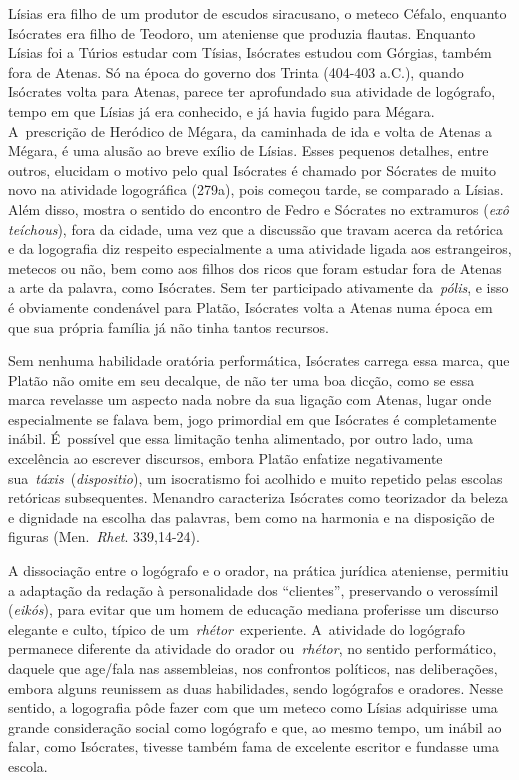 Lísias era filho de um produtor de escudos siracusano, o meteco Céfalo,
enquanto Isócrates era filho de Teodoro, um ateniense que produzia
flautas. Enquanto Lísias foi a Túrios estudar com Tísias, Isócrates
estudou com Górgias, também fora de Atenas. Só na época do governo dos
Trinta (404-403 a.C.), quando Isócrates volta para Atenas, parece ter
aprofundado sua atividade de logógrafo, tempo em que Lísias já era
conhecido, e já havia fugido para Mégara. A~prescrição de Heródico de
Mégara, da caminhada de ida e volta de Atenas a Mégara, é uma alusão ao
breve exílio de Lísias. Esses pequenos detalhes, entre outros, elucidam
o motivo pelo qual Isócrates é chamado por Sócrates de muito novo na atividade
logográfica (279a), pois começou tarde, se comparado a Lísias.
Além disso, mostra o sentido do encontro de Fedro e Sócrates no
extramuros (\emph{exô teíchous}), fora da cidade, uma vez que a
discussão que travam acerca da retórica e da logografia diz respeito
especialmente a uma atividade ligada aos estrangeiros, metecos ou não,
bem como aos filhos dos ricos que foram estudar fora de Atenas a arte da
palavra, como Isócrates. Sem ter participado ativamente da~\emph{pólis},
e isso é obviamente condenável para Platão, Isócrates volta a Atenas
numa época em que sua própria família já não tinha tantos recursos.

Sem nenhuma habilidade oratória performática, Isócrates carrega essa
marca, que Platão não omite em seu decalque, de não ter uma boa dicção,
como se essa marca revelasse um aspecto nada nobre da sua ligação com
Atenas, lugar onde especialmente se falava bem, jogo primordial em que
Isócrates é completamente inábil. É~possível que essa limitação tenha
alimentado, por outro lado, uma excelência ao escrever discursos, embora
Platão enfatize negativamente sua~\emph{táxis}~(\emph{dispositio}), um
isocratismo foi acolhido e muito repetido pelas escolas retóricas
subsequentes. Menandro caracteriza Isócrates como teorizador da beleza e
dignidade na escolha das palavras, bem como na harmonia e na disposição
de figuras (Men.~\emph{Rhet}. 339,14-24).

A dissociação entre o logógrafo e o orador, na prática jurídica
ateniense, permitiu a adaptação da redação à personalidade dos
``clientes'', preservando o verossímil (\emph{eikós}), para evitar que
um homem de educação mediana proferisse um discurso elegante e culto,
típico de um~\emph{rhétor}~experiente. A~atividade do logógrafo
permanece diferente da atividade do orador ou~\emph{rhétor}, no sentido
performático, daquele que age/\allowbreak{}fala nas assembleias, nos confrontos
políticos, nas deliberações, embora alguns reunissem as duas
habilidades, sendo logógrafos e oradores. Nesse sentido, a logografia
pôde fazer com que um meteco como Lísias adquirisse uma grande
consideração social como logógrafo e que, ao mesmo tempo, um inábil ao
falar, como Isócrates, tivesse também fama de excelente escritor e
fundasse uma escola.

